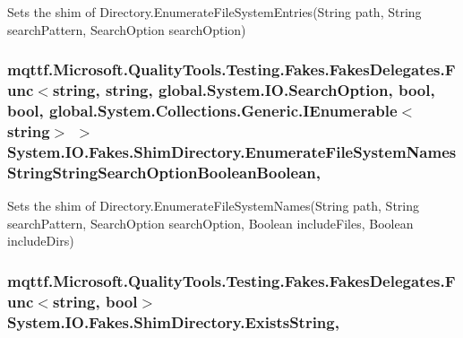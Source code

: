 Sets the shim of Directory.\-Enumerate\-File\-System\-Entries(\-String path, String search\-Pattern, Search\-Option search\-Option)

\hypertarget{class_system_1_1_i_o_1_1_fakes_1_1_shim_directory_a6104cfbc8031d5e83effba6a08dca6c9}{
\subsubsection[{Enumerate\-File\-System\-Names\-String\-String\-Search\-Option\-Boolean\-Boolean}]{\setlength{\rightskip}{0pt plus 5cm}mqttf.\-Microsoft.\-Quality\-Tools.\-Testing.\-Fakes.\-Fakes\-Delegates.\-Func$<$string, string, global.\-System.\-I\-O.\-Search\-Option, bool, bool, global.\-System.\-Collections.\-Generic.\-I\-Enumerable$<$string$>$ $>$ System.\-I\-O.\-Fakes.\-Shim\-Directory.\-Enumerate\-File\-System\-Names\-String\-String\-Search\-Option\-Boolean\-Boolean\hspace{0.3cm}{\ttfamily [static]}, {\ttfamily [set]}}}\label{class_system_1_1_i_o_1_1_fakes_1_1_shim_directory_a6104cfbc8031d5e83effba6a08dca6c9}


Sets the shim of Directory.\-Enumerate\-File\-System\-Names(\-String path, String search\-Pattern, Search\-Option search\-Option, Boolean include\-Files, Boolean include\-Dirs)

\hypertarget{class_system_1_1_i_o_1_1_fakes_1_1_shim_directory_a829ac6939e42928369dde3a1c6a498fa}{
\subsubsection[{Exists\-String}]{\setlength{\rightskip}{0pt plus 5cm}mqttf.\-Microsoft.\-Quality\-Tools.\-Testing.\-Fakes.\-Fakes\-Delegates.\-Func$<$string, bool$>$ System.\-I\-O.\-Fakes.\-Shim\-Directory.\-Exists\-String\hspace{0.3cm}{\ttfamily [static]}, {\ttfamily [set]}}}\label{class_system_1_1_i_o_1_1_fakes_1_1_shim_directory_a829ac6939e42928369dde3a1c6a498fa}


